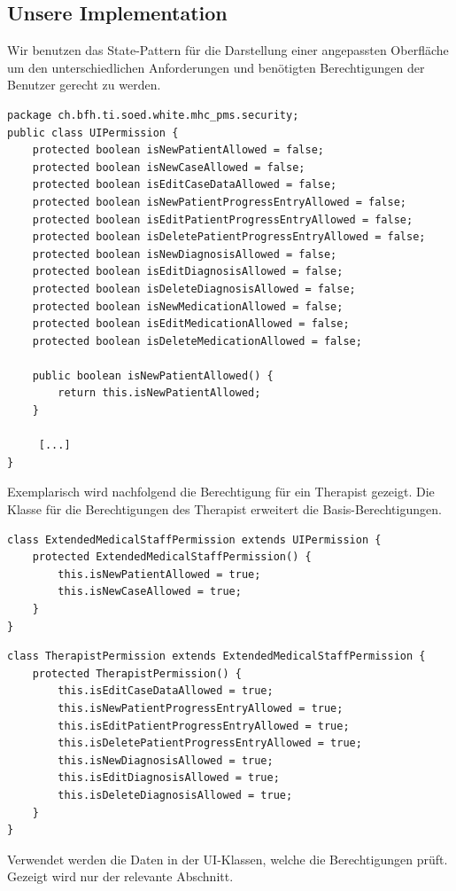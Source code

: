 \documentclass[10pt,a4paper]{article}
\begin{document}
\subsection*{Unsere Implementation}
Wir benutzen das State-Pattern für die Darstellung einer angepassten Oberfläche um den unterschiedlichen Anforderungen und benötigten Berechtigungen der Benutzer gerecht zu werden.

%
\begin{lstlisting}[caption={UIPermission}]
package ch.bfh.ti.soed.white.mhc_pms.security;
public class UIPermission {
	protected boolean isNewPatientAllowed = false;
	protected boolean isNewCaseAllowed = false;
	protected boolean isEditCaseDataAllowed = false;
	protected boolean isNewPatientProgressEntryAllowed = false;
	protected boolean isEditPatientProgressEntryAllowed = false;
	protected boolean isDeletePatientProgressEntryAllowed = false;
	protected boolean isNewDiagnosisAllowed = false;
	protected boolean isEditDiagnosisAllowed = false;
	protected boolean isDeleteDiagnosisAllowed = false;
	protected boolean isNewMedicationAllowed = false;
	protected boolean isEditMedicationAllowed = false;
	protected boolean isDeleteMedicationAllowed = false;
	
	public boolean isNewPatientAllowed() {
		return this.isNewPatientAllowed;
	}

     [...]
}
\end{lstlisting}
%
Exemplarisch wird nachfolgend die Berechtigung für ein Therapist gezeigt. Die Klasse für die Berechtigungen des Therapist erweitert die Basis-Berechtigungen.
%
\begin{lstlisting}[caption={Erweiterte Berechtigungen MedicalStaff}]
class ExtendedMedicalStaffPermission extends UIPermission {
	protected ExtendedMedicalStaffPermission() {
		this.isNewPatientAllowed = true;
		this.isNewCaseAllowed = true;
	}
}
\end{lstlisting}
%
\begin{lstlisting}[caption={Erweiterte Berechtigungen Therapist}]
class TherapistPermission extends ExtendedMedicalStaffPermission {
	protected TherapistPermission() {
		this.isEditCaseDataAllowed = true;
		this.isNewPatientProgressEntryAllowed = true;
		this.isEditPatientProgressEntryAllowed = true;
		this.isDeletePatientProgressEntryAllowed = true;
		this.isNewDiagnosisAllowed = true;
		this.isEditDiagnosisAllowed = true;
		this.isDeleteDiagnosisAllowed = true;
	}
}
\end{lstlisting}
%
Verwendet werden die Daten in der UI-Klassen, welche die Berechtigungen prüft. Gezeigt wird nur der relevante Abschnitt.
\end{document}
